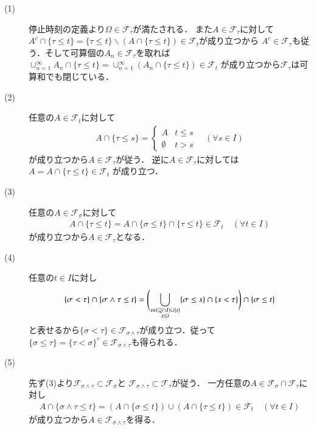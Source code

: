 	\begin{prf}\mbox{}
		\begin{description}
			\item[(1)] 停止時刻の定義より$\Omega \in \mathcal{F}_\tau$が満たされる．
				また$A \in \mathcal{F}_\tau$に対して
				$A^c \cap \{ \tau \leq t \} = \{ \tau \leq t \} \backslash \left( A \cap \{ \tau \leq t \} \right) \in \mathcal{F}_t$が成り立つから
				$A^c \in \mathcal{F}_\tau$も従う．そして可算個の$A_n \in \mathcal{F}_\tau$を取れば
				$\cup_{n=1}^{\infty} A_n \cap \{ \tau \leq t \} = \cup_{n=1}^{\infty} \left( A_n \cap \{ \tau \leq t \} \right) \in \mathcal{F}_t$
				が成り立つから$\mathcal{F}_{\tau}$は可算和でも閉じている．
			
			\item[(2)] 任意の$A \in \mathcal{F}_t$に対して
				\begin{align}
					A \cap \{ \tau \leq s \} =
					\begin{cases}
						A & t \leq s \\
						\emptyset & t > s
					\end{cases}
					\quad (\forall s \in I)
				\end{align}
				が成り立つから$A \in \mathcal{F}_\tau$が従う．
				逆に$A \in \mathcal{F}_\tau$に対しては$A = A \cap \{ \tau \leq t \} \in \mathcal{F}_t$
				が成り立つ．
				
			\item[(3)] 任意の$A \in \mathcal{F}_\sigma$に対して
				\begin{align}
					A \cap \{ \tau \leq t \} = A \cap \{ \sigma \leq t \} \cap \{ \tau \leq t \} \in \mathcal{F}_t 
					\quad (\forall t \in I)
				\end{align}
				が成り立つから$A \in \mathcal{F}_\tau$となる．
				
			\item[(4)] 任意の$t \in I$に対し
				\begin{align}
					\{\sigma < \tau\} \cap \{\sigma \wedge \tau \leq t\}
					= \Biggl(\bigcup_{\substack{s \in (\mathbb{Q} \cap I)\cup\{t\} \\ s \leq t}} \{\sigma \leq s\} \cap \{s < \tau\} \Biggr) \cap \{\sigma \leq t\}
				\end{align}
				と表せるから$\{\sigma < \tau\} \in \mathcal{F}_{\sigma \wedge \tau}$が成り立つ．従って
				$\{\sigma \leq \tau\} = \{\tau < \sigma\}^c \in \mathcal{F}_{\sigma \wedge \tau}$も得られる．
			
			\item[(5)] 先ず(3)より$\mathcal{F}_{\sigma \wedge \tau} \subset \mathcal{F}_\sigma$と
				$\mathcal{F}_{\sigma \wedge \tau} \subset \mathcal{F}_\tau$が従う．
				一方任意の$A \in \mathcal{F}_\sigma \cap \mathcal{F}_\tau$に対し
				\begin{align}
					A \cap \{ \sigma \wedge \tau \leq t \} 
					= \left( A \cap \{ \sigma \leq t \} \right) \cup \left( A \cap \{ \tau \leq t \} \right) \in \mathcal{F}_t \quad (\forall t \in I)
				\end{align}
				が成り立つから$A \in \mathcal{F}_{\sigma \wedge \tau}$を得る．
			

\end{description}
\end{prf}
